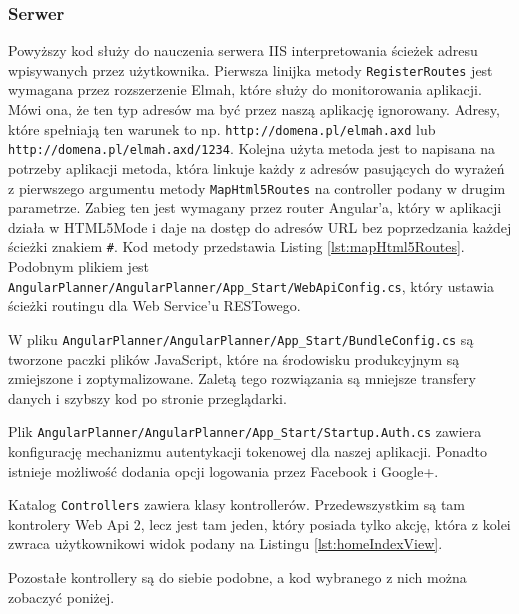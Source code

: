 \documentclass[10pt,titlepage]{article}
\begin{document}
\subsubsection{Serwer}
\lstset{style=sharpc}

\par Powyższy kod służy do nauczenia serwera IIS interpretowania ścieżek adresu wpisywanych przez użytkownika. Pierwsza linijka metody \verb|RegisterRoutes| jest wymagana przez rozszerzenie Elmah, które służy do monitorowania aplikacji. Mówi ona, że ten typ adresów ma być przez naszą aplikację ignorowany. Adresy, które spełniają ten warunek to np. \verb|http://domena.pl/elmah.axd| lub \verb|http://domena.pl/elmah.axd/1234|. Kolejna użyta metoda jest to napisana na potrzeby aplikacji metoda, która linkuje każdy z adresów pasujących do wyrażeń z pierwszego argumentu metody \verb|MapHtml5Routes| na controller podany w drugim parametrze. Zabieg ten jest wymagany przez router Angular'a, który w aplikacji działa w HTML5Mode i daje na dostęp do adresów URL bez poprzedzania każdej ścieżki znakiem \verb|#|. Kod metody przedstawia Listing \ref{lst:mapHtml5Routes}. Podobnym plikiem jest \verb|AngularPlanner/AngularPlanner/App_Start/WebApiConfig.cs|, który ustawia ścieżki routingu dla Web Service'u RESTowego.

\par W pliku \verb|AngularPlanner/AngularPlanner/App_Start/BundleConfig.cs| są tworzone paczki plików JavaScript, które na środowisku produkcyjnym są zmiejszone i zoptymalizowane. Zaletą tego rozwiązania są mniejsze transfery danych i szybszy kod po stronie przeglądarki.\par Plik \verb|AngularPlanner/AngularPlanner/App_Start/Startup.Auth.cs| zawiera konfigurację mechanizmu autentykacji tokenowej dla naszej aplikacji. Ponadto istnieje możliwość dodania opcji logowania przez Facebook i Google+.\par Katalog \verb|Controllers| zawiera klasy kontrollerów. Przedewszystkim są tam kontrolery Web Api 2, lecz jest tam jeden, który posiada tylko akcję, która z kolei zwraca użytkownikowi widok podany na Listingu \ref{lst:homeIndexView}.

\par Pozostałe kontrollery są do siebie podobne, a kod wybranego z nich można zobaczyć poniżej.
\end{document}
